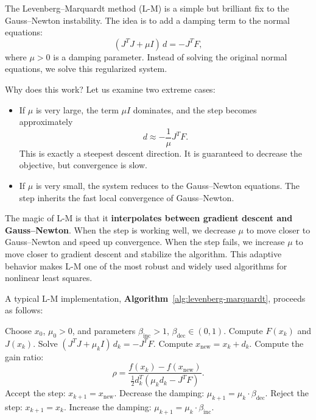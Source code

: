\documentclass[lang=en,color=blue,mode=fancy,titlestyle=hang]{elegantbook}
\newcommand{\algoref}[1]{\textbf{Algorithm}~\ref{#1}}
\begin{document}
The Levenberg–Marquardt method (L-M) is a simple but brilliant fix to the Gauss–Newton instability.
The idea is to add a damping term to the normal equations:
\[
(J^T J + \mu I) \, d = -J^T F,
\]
where $\mu > 0$ is a damping parameter. Instead of solving the original normal equations, we solve
this regularized system.

Why does this work? Let us examine two extreme cases:
\begin{itemize}
  \item If $\mu$ is very large, the term $\mu I$ dominates, and the step becomes approximately
  \[
  d \approx -\frac{1}{\mu} J^T F.
  \]
  This is exactly a steepest descent direction. It is guaranteed to decrease the objective,
  but convergence is slow.
  \item If $\mu$ is very small, the system reduces to the Gauss–Newton equations. The step inherits
  the fast local convergence of Gauss–Newton.
\end{itemize}

The magic of L-M is that it \textbf{interpolates between gradient descent and Gauss–Newton}.
When the step is working well, we decrease $\mu$ to move closer to Gauss–Newton and speed up
convergence. When the step fails, we increase $\mu$ to move closer to gradient descent and stabilize
the algorithm. This adaptive behavior makes L-M one of the most robust and widely used algorithms
for nonlinear least squares.

A typical L-M implementation, \algoref{alg:levenberg-marquardt}, proceeds as follows:

\begin{algorithm}[H]
\caption{Levenberg–Marquardt Method}
\label{alg:levenberg-marquardt}
\begin{algorithmic}
\State Choose $x_0$, $\mu_0 > 0$, and parameters $\beta_{\text{inc}} > 1$, $\beta_{\text{dec}} \in (0, 1)$.
  \State Compute $F(x_k)$ and $J(x_k)$.
  \State Solve $(J^T J + \mu_k I) \, d_k = -J^T F$.
  \State Compute $x_{\text{new}} = x_k + d_k$.
  \State Compute the gain ratio:
  \[
  \rho = \frac{f(x_k) - f(x_{\text{new}})}{\frac12 d_k^T (\mu_k d_k - J^T F)}.
  \]
    \State Accept the step: $x_{k+1} = x_{\text{new}}$.
    \State Decrease the damping: $\mu_{k+1} = \mu_k \cdot \beta_{\text{dec}}$.
  \Else
    \State Reject the step: $x_{k+1} = x_k$.
    \State Increase the damping: $\mu_{k+1} = \mu_k \cdot \beta_{\text{inc}}$.
  \EndIf
\EndFor
\end{algorithmic}
\end{algorithm}
\end{document}
